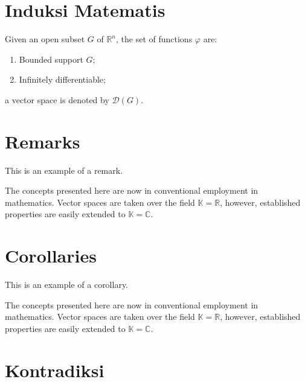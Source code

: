 \documentclass[11pt,fleqn]{book} %
\begin{document}

\section{Induksi Matematis}

\begin{notation}
Given an open subset $G$ of $\mathbb{R}^n$, the set of functions $\varphi$ are:
\begin{enumerate}
\item Bounded support $G$;
\item Infinitely differentiable;
\end{enumerate}
a vector space is denoted by $\mathcal{D}(G)$. 
\end{notation}


\section{Remarks}

This is an example of a remark.

\begin{remark}
The concepts presented here are now in conventional employment in mathematics. Vector spaces are taken over the field $\mathbb{K}=\mathbb{R}$, however, established properties are easily extended to $\mathbb{K}=\mathbb{C}$.
\end{remark}


\section{Corollaries}

This is an example of a corollary.

\begin{corollary}
The concepts presented here are now in conventional employment in mathematics. Vector spaces are taken over the field $\mathbb{K}=\mathbb{R}$, however, established properties are easily extended to $\mathbb{K}=\mathbb{C}$.
\end{corollary}


\section{Kontradiksi}
\end{document}
